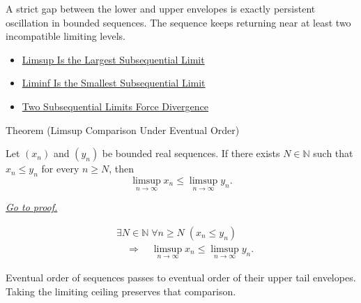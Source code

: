 \begin{remark*}[Interpretation]
A strict gap between the lower and upper envelopes is exactly persistent
oscillation in bounded sequences. The sequence keeps returning near at least
two incompatible limiting levels.
\end{remark*}

\begin{dependencies}
\begin{itemize}
  \item \hyperref[thm:limsup-largest-subsequential-limit]{Limsup Is the Largest Subsequential Limit}
  \item \hyperref[thm:liminf-smallest-subsequential-limit]{Liminf Is the Smallest Subsequential Limit}
  \item \hyperref[thm:two-subsequential-limits-force-divergence]{Two Subsequential Limits Force Divergence}
\end{itemize}
\end{dependencies}


\begin{theorembox}{Theorem (Limsup Comparison Under Eventual Order)}
\begin{theorem}
\label{thm:limsup-comparison-under-eventual-order}
Let $(x_n)$ and $(y_n)$ be bounded real sequences. If there exists
$N\in\mathbb{N}$ such that $x_n\le y_n$ for every $n\ge N$, then
\[
  \limsup_{n\to\infty}x_n
  \le
  \limsup_{n\to\infty}y_n.
\]

\smallskip
\noindent
\hyperref[prf:limsup-comparison-under-eventual-order]{\textit{Go to proof.}}
\end{theorem}
\end{theorembox}

\begin{remark*}
\[
\begin{aligned}
&\exists N\in\mathbb{N}\;\forall n\ge N\;(x_n\le y_n)\\
&\quad\Longrightarrow\quad
\limsup_{n\to\infty}x_n
\le
\limsup_{n\to\infty}y_n.
\end{aligned}
\]
\end{remark*}

\begin{remark*}[Interpretation]
Eventual order of sequences passes to eventual order of their upper tail
envelopes. Taking the limiting ceiling preserves that comparison.
\end{remark*}

